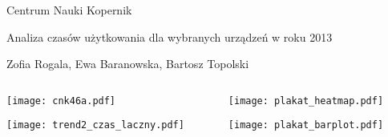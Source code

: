\documentclass[final]{beamer} %
\date{Jul. 31th, 2007}
\begin{document}
  \begin{frame}{Centrum Nauki Kopernik}
  \begin{small}
  	\begin{center}
  		Analiza czasów użytkowania dla wybranych urządzeń w roku 2013
 	\end{center} 
 \end{small}
 \begin{footnotesize}
  	\begin{center}
  		Zofia Rogala, Ewa Baranowska, Bartosz Topolski
 	\end{center} 
 \vspace{-1.2in}
 \end{footnotesize}
    \begin{columns}[t]
      \begin{column}{.48\linewidth}
        \begin{block}{}
        \begin{center}
          \texttt{[image: cnk46a.pdf]}
         \end{center}
        \end{block}
        
	 \vspace{-1.2in}
        \begin{block}{}
          \begin{center}
          \texttt{[image: trend2\_czas\_laczny.pdf]}
         \end{center}
        \end{block}
      \end{column}
      \begin{column}{.48\linewidth}
        \begin{block}{}
    
   		  \begin{center}
          \texttt{[image: plakat\_heatmap.pdf]}
         \end{center}
        \end{block}


	 
	 
	 \vspace{-0.9in}
        \begin{block}{}
		\begin{center}
          \texttt{[image: plakat\_barplot.pdf]}
         \end{center}
        \end{block}
      \end{column}
    \end{columns}
    \vfill
  \end{frame}
\end{document}
